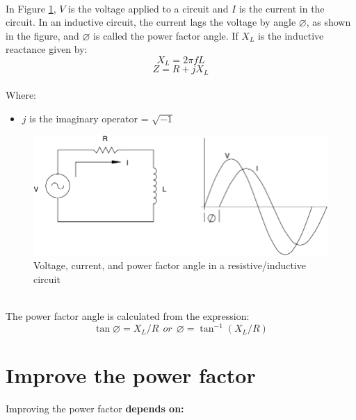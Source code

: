 \documentclass[12pt,fleqn]{book} %
\begin{document}
\\ In Figure \ref{fig:pf 2}, $V$ is the voltage applied to a circuit and $I$ is the current in the circuit. In an inductive circuit, the current lags the voltage by angle $\varnothing$, as shown in the figure, and $\varnothing$ is called the power factor angle. If $X_{L}$ is the inductive reactance given by:
\begin{equation}
    X_{L}=2\pi fL
\end{equation}
\begin{equation}
    Z=R+jX_{L}
\end{equation}
\\ Where:
\begin{itemize}
    \item $j$ is the imaginary operator = $\sqrt{-1}$
\end{itemize}
\begin{figure}[!h]
    \centering
    \includegraphics[width=1\linewidth]{pf 2.png}
    \caption{Voltage, current, and power factor angle in a resistive/inductive circuit}
    \label{fig:pf 2}
    \end{figure}
    \\ The power factor angle is calculated from the expression:
    \begin{equation}
    \tan \varnothing=X_{L}/R \ \ or \ \ \varnothing=\tan^{-1}\left ( X_{L}/R \right )
    \end{equation}
\section{Improve the power factor}
Improving the power factor \textbf{depends on:}
\end{document}
